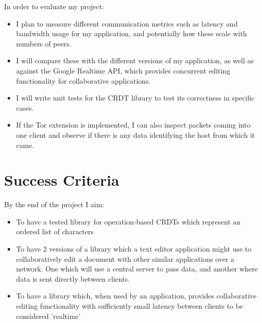 \documentclass[12pt,a4paper]{article}
\begin{document}
In order to evaluate my project:
\begin{itemize}
	\item I plan to measure different communication metrics such as latency and bandwidth usage for my application, and potentially how these scale with numbers of peers.
	\item  I will compare these with the different versions of my application, as well as against the Google Realtime API, which provides concurrent editing functionality for collaborative applications.
	\item I will write unit tests for the CRDT library to test its correctness in specific cases.
	\item  If the Tor extension is implemented, I can also inspect packets coming into one client and observe if there is any data identifying the host from which it came.
\end{itemize}   
%
%
%
%
%
%
\section*{Success Criteria}
By the end of the project I aim:
\begin{itemize}
	\item To have a tested library for operation-based CRDTs which represent an ordered list of characters
	\item To have 2 versions of a library which a text editor application might use to collaboratively edit a document with other similar applications over a network. One which will use a central server to pass data, and another where data is sent directly between clients.
	\item To have a library which, when used by an application, provides collaborative editing functionality with sufficiently small latency between clients to be considered 'realtime'
\end{itemize}
%
%
%
%
%
%
%
%
%
\pagebreak
\end{document}
